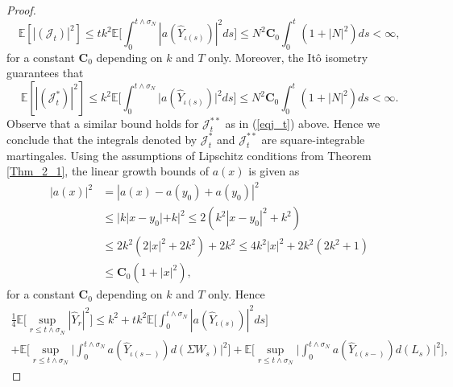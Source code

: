\begin{proof}
\begin{equation}
    \mathbb{E}[|(\mathcal{J}_t)|^2] \leq tk^2 \mathbb{E}\bigg[ \int^{t \land \sigma_N}_{0} |a(\hat{Y}_{\iota(s)})|^2ds\bigg] \leq  N^2 \mathbf{C}_0  \int^t_{0} (1 + |N|^2)ds < \infty,
\end{equation}
for a constant $\mathbf{C}_0$ depending on $k$ and $T$ only. Moreover, the It\^o isometry guarantees that 
\begin{equation}\label{eqj_t}
    \mathbb{E}[|(\mathcal{J}^{*}_t)|^2] \leq k^2  \mathbb{E}\bigg[\int^{t \land \sigma_N}_{0}\big|a(\hat{Y}_{\iota(s)})\big|^2 ds  \bigg] \leq  N^2 \mathbf{C}_0  \int^t_{0} (1 + |N|^2)ds < \infty.
\end{equation}
Observe that a similar bound holds for $\mathcal{J}^{**}_t$ as in (\ref{eqj_t}) above.  Hence we conclude that the integrals denoted by $\mathcal{J}^{*}_t$ and $\mathcal{J}^{**}_t$ are square-integrable martingales.
Using the assumptions of Lipschitz conditions from Theorem \ref{Thm_2_1}, the linear growth bounds of $a(x)$ is given as
\begin{equation}\label{eq12}
    \begin{aligned}
        |a(x)|^2 &= |a(x) - a(y_0) + a(y_0)|^2 \\
        &\leq |k|x-y_0| + k|^2 \leq 2(k^2|x-y_0|^2 + k^2)\\
        &\leq 2k^2(2|x|^2 + 2k^2) + 2k^2 \leq 4k^2|x|^2 + 2k^2(2k^2+1)\\
        &\leq \mathbf{C}_0(1 + |x|^2),
    \end{aligned}
\end{equation}
for a constant $\mathbf{C}_0$ depending on $k$ and $T$ only. Hence %
\begin{multline}\label{jandj}
    \frac{1}{4}\mathbb{E}\big[\sup_{r \leq t  \land \sigma_N}|\hat{Y}_r|^2\big] \leq k^2 
              + tk^2 \mathbb{E}\bigg[ \int^{t \land \sigma_N}_{0} |a(\hat{Y}_{\iota(s)})|^2ds\bigg]  \\
              +\mathbb{E}\bigg[\sup_{r \leq t  \land \sigma_N}\bigg|\int^{t \land \sigma_N}_{0}a(\hat{Y}_{\iota(s-)})d(\Sigma W_s)\bigg|^2 \bigg]
              + \mathbb{E}\bigg[\sup_{r \leq t  \land \sigma_N}\bigg|\int^{t \land \sigma_N}_{0}a(\hat{Y}_{\iota(s-)})d(L_s) \bigg|^2 \bigg],

\end{multline}
\end{proof}
